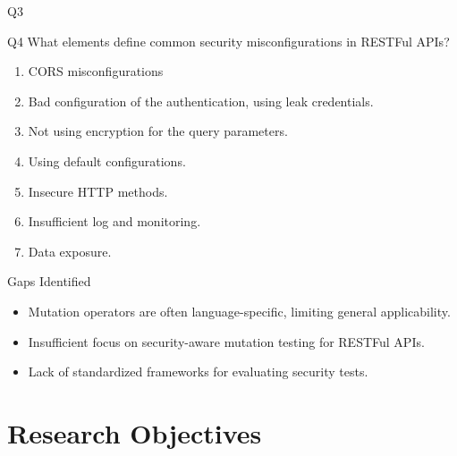 \documentclass[12pt]{beamer}
\theoremstyle{remark}
\theoremstyle{definition}
\begin{document}
\begin{frame}[allowframebreaks]
\begin{block}{Q3}
\begin{enumerate}
    \end{enumerate}
  \end{block}
\pagebreak
\begin{block}{Q4}
    What elements define common security misconfigurations in RESTFul APIs?
    \begin{enumerate}
      \item CORS misconfigurations
      \item Bad configuration of the authentication, using leak credentials.
      \item Not using encryption for the query parameters.
      \item Using default configurations.
      \item Insecure HTTP methods.
      \item Insufficient log and monitoring.
      \item Data exposure.
    \end{enumerate}

\end{block}
\pagebreak
\begin{block}{Gaps Identified}
\begin{itemize}
    \item Mutation operators are often language-specific, limiting general applicability.
    \item Insufficient focus on security-aware mutation testing for RESTFul APIs.
    \item Lack of standardized frameworks for evaluating security tests.
\end{itemize}
\end{block}
\end{frame}

\section{Research Objectives}
\end{document}
